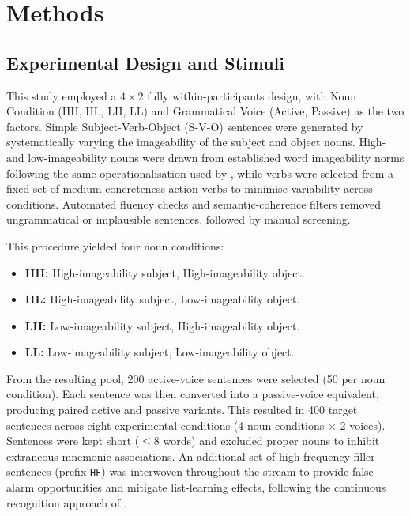 \documentclass[12pt, a4paper]{article}
\begin{document}
\section{Methods}

\subsection{Experimental Design and Stimuli}

This study employed a $4 \times 2$ fully within-participants design, with Noun
Condition (HH, HL, LH, LL) and Grammatical Voice (Active, Passive) as the two
factors. Simple Subject-Verb-Object (S-V-O) sentences were generated by
systematically varying the imageability of the subject and object nouns. High-
and low-imageability nouns were drawn from established word imageability norms
following the same operationalisation used by \citet{james1973}, while verbs
were selected from a fixed set of medium-concreteness action verbs to minimise
variability across conditions. Automated fluency checks and semantic-coherence
filters removed ungrammatical or implausible sentences, followed by manual
screening.

This procedure yielded four noun conditions:
\begin{itemize}
    \item \textbf{HH:} High-imageability subject, High-imageability object.
    \item \textbf{HL:} High-imageability subject, Low-imageability object.
    \item \textbf{LH:} Low-imageability subject, High-imageability object.
    \item \textbf{LL:} Low-imageability subject, Low-imageability object.
\end{itemize}

From the resulting pool, 200 active-voice sentences were selected (50 per noun
condition). Each sentence was then converted into a passive-voice equivalent,
producing paired active and passive variants. This resulted in 400 target
sentences across eight experimental conditions (4 noun conditions $\times$ 2
voices). Sentences were kept short ($\leq 8$ words) and excluded proper nouns
to inhibit extraneous mnemonic associations. An additional set of high-frequency
filler sentences (prefix \texttt{HF}) was interwoven throughout the stream to
provide false alarm opportunities and mitigate list-learning effects, following
the continuous recognition approach of \citet{begg1971}.
\end{document}
